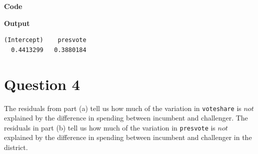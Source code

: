 \documentclass[12pt,letterpaper]{article}
\begin{document}
\begin{enumerate}
		\textbf{Code}
		
		\vspace{.5cm}
		\textbf{Output}
		\begin{verbatim}
(Intercept)    presvote 
  0.4413299   0.3880184 
		\end{verbatim}
	\end{enumerate}
	

\newpage	
\section*{Question 4}
\noindent The residuals from part (a) tell us how much of the variation in \texttt{voteshare} is $not$ explained by the difference in spending between incumbent and challenger. The residuals in part (b) tell us how much of the variation in \texttt{presvote} is $not$ explained by the difference in spending between incumbent and challenger in the district.
\end{document}
